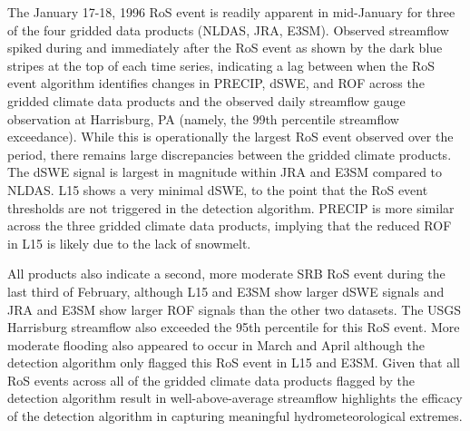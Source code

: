 \documentclass[draft]{agujournal2019}
\begin{document}
The January 17-18, 1996 RoS event is readily apparent in mid-January for three of the four gridded data products (NLDAS, JRA, E3SM). 
Observed streamflow spiked during and immediately after the RoS event as shown by the dark blue stripes at the top of each time series, indicating a lag between when the RoS event algorithm identifies changes in PRECIP, dSWE, and ROF across the gridded climate data products and the observed daily streamflow gauge observation at Harrisburg, PA (namely, the 99th percentile streamflow exceedance).
While this is operationally the largest RoS event observed over the period, there remains large discrepancies between the gridded climate products. 
The dSWE signal is largest in magnitude within JRA and E3SM compared to NLDAS. 
L15 shows a very minimal dSWE, to the point that the RoS event thresholds are not triggered in the detection algorithm. 
PRECIP is more similar across the three gridded climate data products, implying that the reduced ROF in L15 is likely due to the lack of snowmelt.

All products also indicate a second, more moderate SRB RoS event during the last third of February, although L15 and E3SM show larger dSWE signals and JRA and E3SM show larger ROF signals than the other two datasets. 
The USGS Harrisburg streamflow also exceeded the 95th percentile for this RoS event. 
More moderate flooding also appeared to occur in March and April although the detection algorithm only flagged this RoS event in L15 and E3SM. 
Given that all RoS events across all of the gridded climate data products flagged by the detection algorithm result in well-above-average streamflow highlights the efficacy of the detection algorithm in capturing meaningful hydrometeorological extremes.
\end{document}

